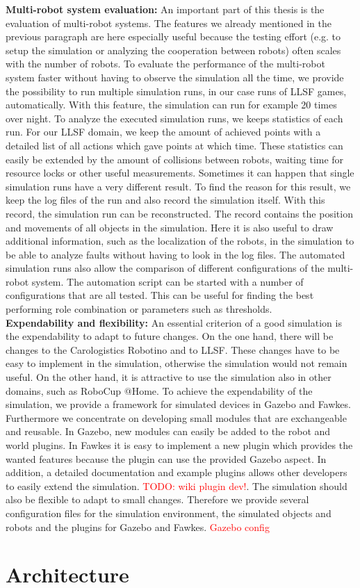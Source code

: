 \textbf{Multi-robot system evaluation:} An important part of this thesis is the evaluation of multi-robot systems. The features we already mentioned in the previous paragraph are here especially useful because the testing effort (e.g. to setup the simulation or analyzing the cooperation between robots) often scales with the number of robots. To evaluate the performance of the multi-robot system faster without having to observe the simulation all the time, we provide the possibility to run multiple simulation runs, in our case runs of LLSF games, automatically. With this feature, the simulation can run for example 20 times over night. To analyze the executed simulation runs, we keeps statistics of each run. For our LLSF domain, we keep the amount of achieved points with a detailed list of all actions which gave points at which time. These statistics can easily be extended by the amount of collisions between robots, waiting time for resource locks or other useful measurements. Sometimes it can happen that single simulation runs have a very different result. To find the reason for this result, we keep the log files of the run and also record the simulation itself. With this record, the simulation run can be reconstructed. The record contains the position and movements of all objects in the simulation. Here it is also useful to draw additional information, such as the localization of the robots, in the simulation to be able to analyze faults without having to look in the log files. The automated simulation runs also allow the comparison of different configurations of the multi-robot system. The automation script can be started with a number of configurations that are all tested. This can be useful for finding the best performing role combination or parameters such as thresholds.\\
\textbf{Expendability and flexibility:} An essential criterion of a good simulation is the expendability to adapt to future changes. On the one hand, there will be changes to the Carologistics Robotino and to LLSF. These changes have to be easy to implement in the simulation, otherwise the simulation would not remain useful. On the other hand, it is attractive to use the simulation also in other domains, such as RoboCup @Home. To achieve the expendability of the simulation, we provide a framework for simulated devices in Gazebo and Fawkes. Furthermore we concentrate on developing small modules that are exchangeable and reusable. In Gazebo, new modules can easily be added to the robot and world plugins. In Fawkes it is easy to implement a new plugin which provides the wanted features because the plugin can use the provided Gazebo aspect. In addition, a detailed documentation and example plugins allows other developers to easily extend the simulation. \textcolor{red}{TODO: wiki plugin dev!}. The simulation should also be flexible to adapt to small changes. Therefore we provide several configuration files for the simulation environment, the simulated objects and robots and the plugins for Gazebo and Fawkes. \textcolor{red}{Gazebo config}



\section{Architecture}
